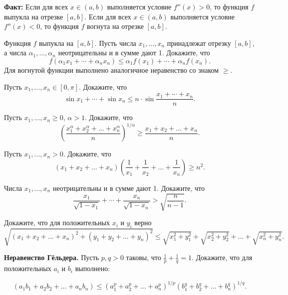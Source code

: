 \documentclass{article}
\begin{document}
    \textbf{Факт:} Если для всех $x \in (a, b)$ выполняется условие $f''(x) > 0$, то функция $f$ выпукла на отрезке $[a, b]$.
    Если для всех $x \in (a, b)$ выполняется условие $f''(x) < 0$, то функция $f$ вогнута на отрезке $[a, b]$.
    \begin{enumerate_boxed}

        \item Функция $f$ выпукла на $[a, b]$.
        Пусть числа $x_1, \ldots, x_n$ принадлежат отрезку $[a, b]$, а числа $\alpha_1, \ldots, \alpha_n$ неотрицательны и в сумме дают 1.
        Докажите, что
        \[
            f(\alpha_1 x_1 + \cdots + \alpha_n x_n) \leqslant \alpha_1 f(x_1) + \cdots + \alpha_n f(x_n).
        \]
        Для вогнутой функции выполнено аналогичное неравенство со знаком $\geqslant$.

        \item Пусть $x_1, \ldots, x_n \in [0, \pi]$.
        Докажите, что
        \[
            \sin x_1 + \cdots + \sin x_n \leq n \cdot \sin \frac{x_1 + \cdots + x_n}{n}.
        \]

        \item Пусть $x_1, \ldots, x_n \geqslant 0$, $\alpha > 1$.
        Докажите, что
        \[
            \left(\frac{x_1^\alpha + x_2^\alpha + \dotsc + x_n^\alpha}{n}\right)^{1/\alpha} \geqslant \frac{x_1 + x_2 + \dotsc + x_n}{n}.
        \]

        \item Пусть $x_1, \ldots, x_n > 0$.
        Докажите, что
        \[
            \left(x_1 + x_2 + \dotsc + x_n\right)\left(\frac{1}{x_1} + \frac{1}{x_2} + \dotsc + \frac{1}{x_n}\right) \geqslant n^2.
        \]

        \item Числа $x_1, \ldots, x_n$ неотрицательны и в сумме дают 1.
        Докажите, что
        \[
            \frac{x_1}{\sqrt{1 - x_1}} + \cdots + \frac{x_n}{\sqrt{1 - x_n}} > \sqrt{\frac{n}{{n - 1}}}.
        \]

        \item Докажите, что для положительных $x_i$ и $y_i$ верно
        \[
            \sqrt{\left(x_1 + x_2 + \dotsc + x_n\right)^2 + \left(y_1 + y_2 + \dotsc + y_n\right)^2} \leq \sqrt{x_1^2 + y_1^2} + \sqrt{x_2^2 + y_2^2} + \dotsc + \sqrt{x_n^2 + y_n^2}.
        \]

        \item \textbf{Неравенство Гёльдера.} Пусть $p, q > 0$ таковы, что $\frac{1}{p} + \frac{1}{q} = 1$.
        Докажите, что для положительных $a_i$ и $b_i$ выполнено:

        \[
            (a_1 b_1 + a_2 b_2 + \dotsc + a_n b_n) \leqslant \left(a_1^p + a_2^p + \dotsc + a_n^p\right)^{1/p} \left(b_1^q + b_2^q+ \dotsc +b_n^q\right)^{1/q}.
        \]

    \end{enumerate_boxed}
\end{document}
